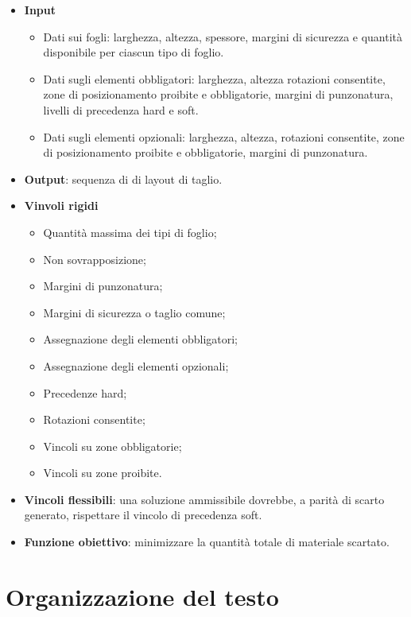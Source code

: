 \begin{itemize}
    \item \textbf{Input}
    \begin{itemize}
        \item Dati sui fogli: larghezza, altezza, spessore, margini di sicurezza e quantità disponibile per ciascun tipo di foglio.
        \item Dati sugli elementi obbligatori: larghezza, altezza rotazioni consentite, zone di posizionamento proibite e obbligatorie, margini di punzonatura, livelli di precedenza hard e soft.
        \item Dati sugli elementi opzionali: larghezza, altezza, rotazioni consentite, zone di posizionamento proibite e obbligatorie, margini di punzonatura.
    \end{itemize}
    \item \textbf{Output}: sequenza di di layout di taglio.
    \item \textbf{Vinvoli rigidi}
    \begin{itemize}
        \item Quantità massima dei tipi di foglio;
        \item Non sovrapposizione;
        \item Margini di punzonatura;
        \item Margini di sicurezza o taglio comune;
        \item Assegnazione degli elementi obbligatori;
        \item Assegnazione degli elementi opzionali;
        \item Precedenze hard;
        \item Rotazioni consentite;
        \item Vincoli su zone obbligatorie;
        \item Vincoli su zone proibite.
    \end{itemize}
    \item \textbf{Vincoli flessibili}: una soluzione ammissibile dovrebbe, a parità di scarto generato, rispettare il vincolo di precedenza soft.
    \item \textbf{Funzione obiettivo}: minimizzare la quantità totale di materiale scartato.
\end{itemize}


\section{Organizzazione del testo}

